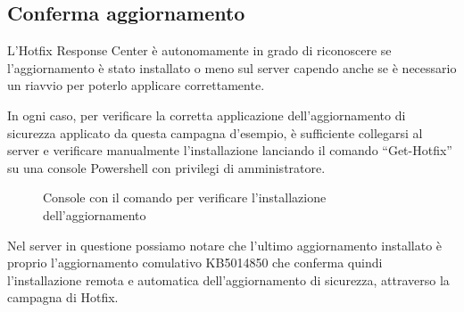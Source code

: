 \subsection{Conferma aggiornamento}
L’Hotfix Response Center è autonomamente in grado di riconoscere se 
l'aggiornamento è stato installato o meno sul server capendo anche se è 
necessario un riavvio per poterlo applicare correttamente.

In ogni caso, per verificare la corretta applicazione dell'aggiornamento di 
sicurezza applicato da questa campagna d’esempio, è sufficiente collegarsi al 
server e verificare manualmente l’installazione lanciando il comando “Get-Hotfix” 
su una console Powershell con privilegi di amministratore.

\begin{figure}[H]
\begin{flushright}
    \centering
    \caption{Console con il comando per verificare l'installazione dell'aggiornamento}
    \label{fig:Console con il comando per verificare l'installazione dell'aggiornamento}
\end{flushright}
\end{figure}

Nel server in questione possiamo notare che l'ultimo aggiornamento installato è
proprio l'aggiornamento comulativo KB5014850 che conferma quindi l'installazione
remota e automatica dell'aggiornamento di sicurezza, attraverso la campagna di Hotfix.
